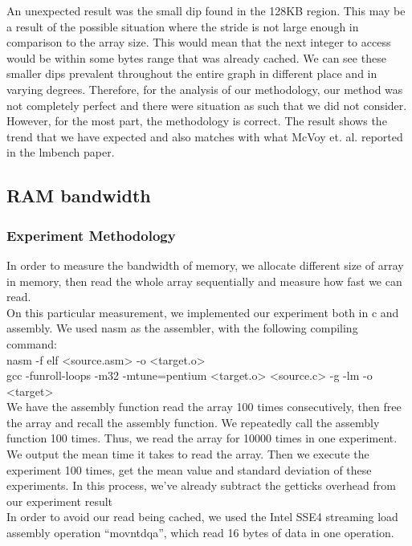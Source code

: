 \documentclass{article} %
\begin{document}
An unexpected result was the small dip found in the 128KB region. This may be a result of the possible situation where the stride is not large enough in comparison to the array size. This would mean that the next integer to access would be within some bytes range that was already cached. We can see these smaller dips prevalent throughout the entire graph in different place and in varying degrees. Therefore, for the analysis of our methodology, our method was not completely perfect and there were situation as such that we did not consider. However, for the most part, the methodology is correct. The result shows the trend that we have expected and also matches with what McVoy et. al. reported in the lmbench paper.


\subsection{RAM bandwidth}
\subsubsection{Experiment Methodology}
In order to measure the bandwidth of memory, we allocate different size of array in memory, then read the whole array sequentially and measure how fast we can read. \\
On this particular measurement, we implemented our experiment both in c and assembly. We used nasm as the assembler, with the following compiling command:\\

nasm -f elf <source.asm> -o <target.o> \\
gcc -funroll-loops -m32 -mtune=pentium <target.o> <source.c> -g -lm -o <target>\\

We have the assembly function read the array 100 times consecutively, then free the array and recall the assembly function. We repeatedly call the assembly function 100 times. Thus, we read the array for 10000 times in one experiment. We output the mean time it takes to read the array. Then we execute the experiment 100 times, get the mean value and standard deviation of these experiments. In this process, we've already subtract the getticks overhead from our experiment result\\
In order to avoid our read being cached, we used the Intel SSE4 streaming load assembly operation ``movntdqa'', which read 16 bytes of data in one operation.\\
\end{document}
